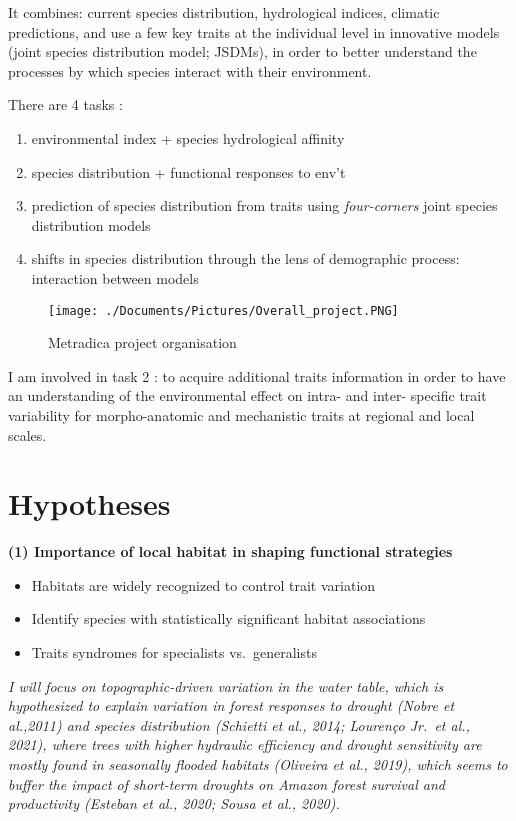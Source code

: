 \documentclass[
]{book}
\providecommand{\tightlist}{%
  \setlength{\itemsep}{0pt}\setlength{\parskip}{0pt}}
\begin{document}
It combines: current species distribution, hydrological indices, climatic predictions, and use a few key traits at the individual level in innovative models (joint species distribution model; JSDMs), in order to better understand the processes by which species interact with their environment.

There are 4 tasks :

\begin{enumerate}
\def\labelenumi{\arabic{enumi}.}
\tightlist
\item
  environmental index + species hydrological affinity
\item
  species distribution + functional responses to env't\\
\item
  prediction of species distribution from traits using \emph{four-corners} joint species distribution models
\item
  shifts in species distribution through the lens of demographic process: interaction between models
\end{enumerate}

\begin{figure}
\centering
\texttt{[image: ./Documents/Pictures/Overall\_project.PNG]}
\caption{Metradica project organisation}
\end{figure}

I am involved in task 2 : to acquire additional traits information in order to have an understanding of the environmental effect on intra- and inter- specific trait variability for morpho-anatomic and mechanistic traits at regional and local scales.

\hypertarget{hypotheses}{%
\chapter{Hypotheses}\label{hypotheses}}

\textbf{(1) Importance of local habitat in shaping functional strategies}

\begin{itemize}
\tightlist
\item
  Habitats are widely recognized to control trait variation
\item
  Identify species with statistically significant habitat associations
\item
  Traits syndromes for specialists vs.~generalists
\end{itemize}

\emph{I will focus on topographic-driven variation in the water table, which is hypothesized to explain variation in forest responses to drought (Nobre et al.,2011) and species distribution (Schietti et al., 2014; Lourenço Jr.~et al., 2021), where trees with higher hydraulic efficiency and drought sensitivity are mostly found in seasonally flooded habitats (Oliveira et al., 2019), which seems to buffer the impact of short-term droughts on Amazon forest survival and productivity (Esteban et al., 2020; Sousa et al., 2020).}
\end{document}
